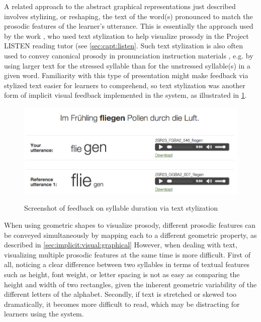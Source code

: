 			A related approach to the abstract graphical representations just described involves stylizing, or reshaping, the text of the word(s) pronounced  to match the prosodic features of the learner's utterance.
	This is essentially the approach used by the work \textcite{Sitaram2011}, who used text stylization to help visualize prosody in the Project LISTEN reading tutor (see \cref{sec:capt:listen}. 
	Such text stylization is also often used to convey canonical prosody in pronunciation instruction materials \citep{Behme-Gissel2005,Hirschfeld2007a}, e.g. by using larger text for the  stressed syllable than for the unstressed syllable(s) in a given word.
	Familiarity with this type of presentation might make feedback via stylized text easier for learners to comprehend, so text stylization was another form of implicit visual feedback implemented in the system, as illustrated in \cref{fig:textstylization}.
			
			
			\begin{figure}
			\centering
			\caption[Feedback on syllable duration via text stylization]{Screenshot of feedback on syllable duration via text stylization}
			\includegraphics[width=\textwidth]{img/screenshots/textStylization}
			\label{fig:textstylization}
			\end{figure}
		
		
		When using geometric shapes to visualize prosody, different prosodic features can be conveyed simultaneously by mapping each to a different geometric property, as described in \cref{sec:implicit:visual:graphical} However, when dealing with text, visualizing multiple prosodic features at the same time is more difficult.
		First of all, noticing a clear difference between two syllables in terms of textual features such as height, font weight, or letter spacing is not as easy as comparing the height and width of two rectangles, given the inherent geometric variability of the different letters of the alphabet.
		Secondly, if text is stretched or skewed too dramatically, it becomes more difficult to read, which may be distracting for learners using the system. 
		
